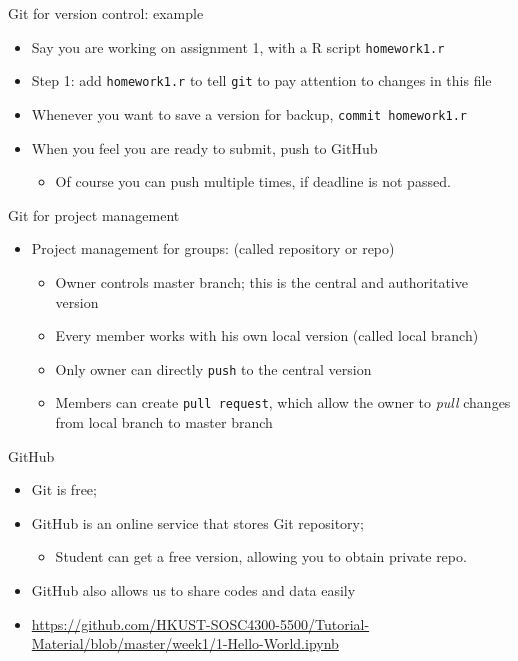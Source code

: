 \documentclass[handout]{beamer}
\begin{document}
\begin{frame}[fragile,label={h:e757a7c4-e53e-43cc-b8ec-eec0ce645a35}]{Git for version control: example}
 \begin{itemize}
\item Say you are working on assignment 1, with a R script \texttt{homework1.r}
\item Step 1: add \texttt{homework1.r} to tell \texttt{git} to pay attention to changes in this file
\item Whenever you want to save a version for backup, \texttt{commit homework1.r}
\item When you feel you are ready to submit, push to GitHub
\begin{itemize}
\item Of course you can push multiple times, if deadline is not passed.
\end{itemize}
\end{itemize}
\end{frame}

\begin{frame}[fragile,label={h:7f9f2f5c-d99a-4153-9ecc-b1e950ed9798}]{Git for project management}
 \begin{itemize}
\item Project management for groups: (called repository or repo)
\begin{itemize}
\item Owner controls \alert{master branch}; this is the central and authoritative version
\item Every member works with his own local version (called \alert{local branch})
\item Only owner can directly \texttt{push} to the central version
\item Members can create \texttt{pull request}, which allow the owner to \emph{pull} changes from local branch to master branch
\end{itemize}
\end{itemize}
\end{frame}

\begin{frame}[label={h:4622c24b-2cd0-4572-84ce-f72548b593dd}]{GitHub}
\begin{itemize}
\item Git is free;
\item GitHub is an online service that stores Git repository;
\begin{itemize}
\item Student can get a free version, allowing you to obtain \alert{private} repo.
\end{itemize}
\item GitHub also allows us to share codes and data easily
\item \url{https://github.com/HKUST-SOSC4300-5500/Tutorial-Material/blob/master/week1/1-Hello-World.ipynb}
\end{itemize}
\end{frame}
\end{document}
